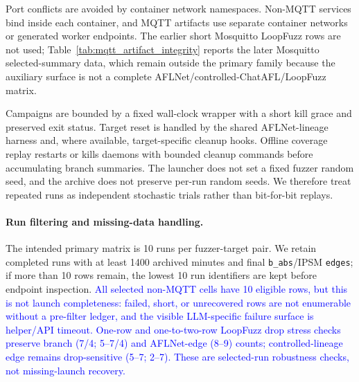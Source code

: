 \documentclass[final,5p,times,number]{elsarticle}
\begin{document}
Port conflicts are avoided by container network namespaces. Non-MQTT services bind inside each container, and MQTT artifacts use separate container networks or generated worker endpoints. The earlier short Mosquitto LoopFuzz rows are not used; Table~\ref{tab:mqtt_artifact_integrity} reports the later Mosquitto selected-summary data, which remain outside the primary family because the auxiliary surface is not a complete AFLNet/controlled-ChatAFL/LoopFuzz matrix.

Campaigns are bounded by a fixed wall-clock wrapper with a short kill grace and preserved exit status. Target reset is handled by the shared AFLNet-lineage harness and, where available, target-specific cleanup hooks. Offline coverage replay restarts or kills daemons with bounded cleanup commands before accumulating branch summaries. The launcher does not set a fixed fuzzer random seed, and the archive does not preserve per-run random seeds. We therefore treat repeated runs as independent stochastic trials rather than bit-for-bit replays.

\paragraph{Run filtering and missing-data handling.}
The intended primary matrix is 10 runs per fuzzer-target pair. We retain completed runs with at least 1400 archived minutes and final \texttt{b\_abs}/IPSM \texttt{edges}; if more than 10 rows remain, the lowest 10 run identifiers are kept before endpoint inspection. \textcolor{blue}{All selected non-MQTT cells have 10 eligible rows, but this is not launch completeness: failed, short, or unrecovered rows are not enumerable without a pre-filter ledger, and the visible LLM-specific failure surface is helper/API timeout. One-row and one-to-two-row LoopFuzz drop stress checks preserve branch (7/4; 5--7/4) and AFLNet-edge (8--9) counts; controlled-lineage edge remains drop-sensitive (5--7; 2--7). These are selected-run robustness checks, not missing-launch recovery.}
\end{document}
